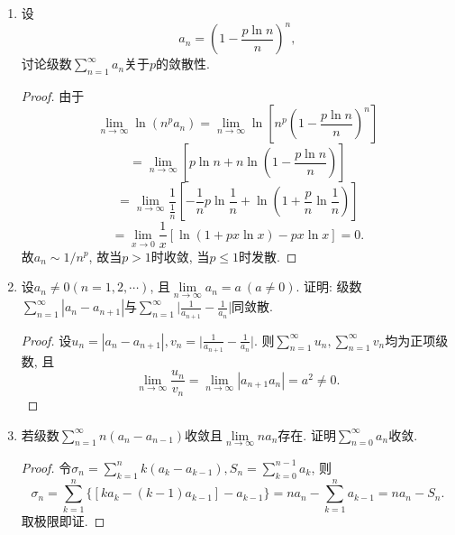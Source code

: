 \documentclass[UTF8,11pt, a4paper, oneside, fontset=none]{ctexbook}
\begin{document}
\begin{enumerate}
\begin{proof}

记分子分母为$A, B$. 显然$A \geq B$且
\[
A - a_1 = a_3 + a_5 + \cdots + a_{2n-1} \leq B.
\]
又
\[
2B \geq B + A - a_1 = \sum_{k=2}^n a_k \to \infty \ (n \to \infty).
\]
故
\[
\Big| \frac{A}{B} -1 \Big| = \frac{|A-B|}{B} \leq \frac{a_1}{B} \to 0.
\]

\end{proof}

\item 设
\[
a_n = \left( 1 - \frac{p \ln n}{n} \right)^n,
\]
讨论级数$\sum_{n=1}^{\infty} a_n$关于$p$的敛散性.


\begin{proof}

由于
\[
\lim_{n \to \infty} \ln (n^p a_n) = \lim_{n \to \infty} \ln \left[  n^p  \left( 1 - \frac{p \ln n}{n} \right)^n \right]
\]
\[
= \lim_{n \to \infty} \left[ p \ln n + n \ln \left( 1 - \frac{p \ln n}{n} \right) \right]
\]
\[
= \lim_{n \to \infty} \frac{1}{\frac{1}{n}} \left[ - \frac{1}{n} p \ln \frac{1}{n} + \ln \left( 1 + \frac{p}{n} \ln \frac{1}{n} \right) \right]
\]
\[
= \lim_{x \to 0} \frac{1}{x} [ \ln(1 + px \ln x) - px \ln x] =0.
\]
故$a_n \sim 1/n^p$, 故当$p > 1$时收敛, 当$ p \leq 1$时发散.

\end{proof}



\item 设$a_n \neq 0 (n = 1, 2, \cdots)$, 且$\lim\limits_{n \to \infty} a_n = a \ (a \neq 0)$. 证明: 级数$\sum_{n=1}^{\infty} |a_n - a_{n+1}|$与$\sum_{n=1}^{\infty} \Big| \frac{1}{a_{n+1}} - \frac{1}{a_n} \Big|$同敛散.

\begin{proof}

设$u_n = |a_n - a_{n+1}|, v_n = \Big| \frac{1}{a_{n+1}} - \frac{1}{a_n} \Big|$. 则$\sum_{n=1}^{\infty} u_n, \sum_{n=1}^{\infty} v_n$均为正项级数, 且
\[
\lim_{n \to \infty} \frac{u_n}{v_n} = \lim_{n \to \infty} |a_{n+1} a_n| = a^2 \neq 0.
\]
\end{proof}


\item 若级数$\sum_{n=1}^{\infty} n (a_n - a_{n-1})$收敛且$\lim\limits_{n \to \infty}n a_n$存在. 证明$\sum_{n=0}^{\infty} a_n$收敛.


\begin{proof}

令$\sigma_n = \sum_{k=1}^n k (a_k - a_{k-1}), S_n = \sum_{k=0}^{n-1} a_k$, 则
\[
\sigma_n = \sum_{k=1}^n\{ [ ka_k - (k-1)a_{k-1} ] -a_{k-1} \} = n a_n - \sum_{k=1}^n a_{k-1} = na_n - S_n.
\]
取极限即证.


\end{proof}
\end{enumerate}
\end{document}
